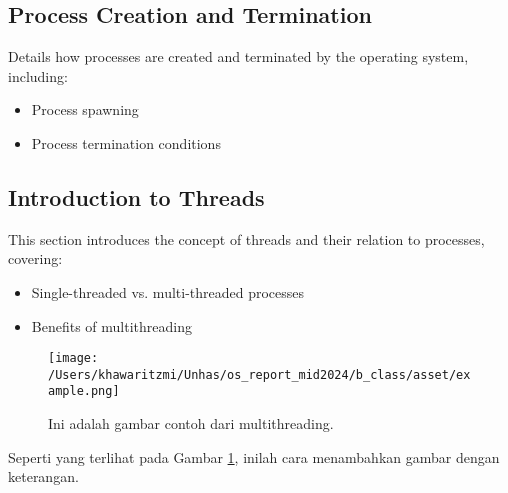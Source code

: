 \documentclass[12pt]{article}
\begin{document}
\subsection{Process Creation and Termination}
Details how processes are created and terminated by the operating system, including:
\begin{itemize}
    \item Process spawning
    \item Process termination conditions
\end{itemize}

\subsection{Introduction to Threads}
This section introduces the concept of threads and their relation to processes, covering:
\begin{itemize}
    \item Single-threaded vs. multi-threaded processes
    \item Benefits of multithreading
\end{itemize}

\begin{figure}[h]
    \centering
    \texttt{[image: /Users/khawaritzmi/Unhas/os\_report\_mid2024/b\_class/asset/example.png]}  %
    \caption{Ini adalah gambar contoh dari multithreading.}
    \label{fig:contoh_gambar}
\end{figure}

Seperti yang terlihat pada Gambar \ref{fig:contoh_gambar}, inilah cara menambahkan gambar dengan keterangan.
\end{document}
